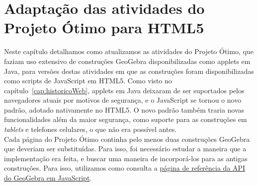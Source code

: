 \chapter{Adaptação das atividades do Projeto Ótimo para HTML5}
\label{cap:partetecnica}







Neste capítulo detalhamos como atualizamos as atividades do Projeto Ótimo, que faziam uso extensivo de construções GeoGebra disponibilizadas como applets em Java, para versões destas atividades em que as construções foram disponibilizadas como scripts de JavaScript em HTML5. Como visto no capítulo~\ref{cap:historicoWeb}, applets em Java deixaram de ser suportados pelos navegadores atuais por motivos de segurança, e o JavaScript se tornou o novo padrão, adotado nativamente no HTML5. O novo padrão também traria novas funcionalidades além da maior segurança, como suporte para as construções em \textit{tablets} e telefones celulares, o que não era possível antes.
\\
Cada página do Projeto Ótimo continha pelo menos duas construções GeoGebra que deveriam ser substituídas. Para isso, foi necessário estudar a maneira que a implementação era feita, e buscar uma maneira de incorporá-los para as antigas construções. Para isso, utilizamos como consulta a \href{https://wiki.geogebra.org/en/Reference:GeoGebra_Apps_API}{página de referência da API do GeoGebra em JavaScript}.
\\

